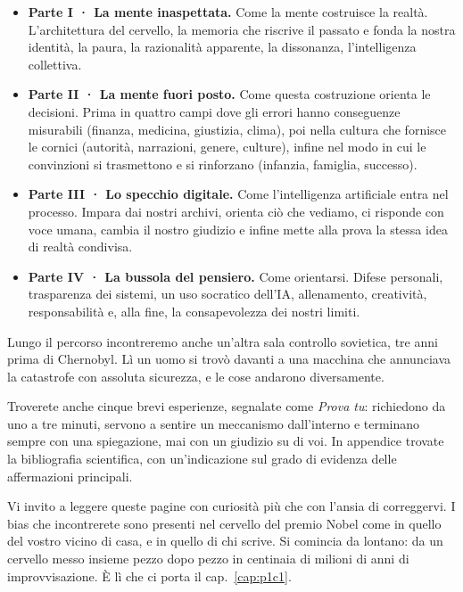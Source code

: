 \begin{itemize}
    \item \textbf{Parte I · La mente inaspettata.}
    Come la mente costruisce la realtà. L'architettura del cervello, la memoria che riscrive il passato e fonda la nostra identità, la paura, la razionalità apparente, la dissonanza, l'intelligenza collettiva.

    \item \textbf{Parte II · La mente fuori posto.}
    Come questa costruzione orienta le decisioni. Prima in quattro campi dove gli errori hanno conseguenze misurabili (finanza, medicina, giustizia, clima), poi nella cultura che fornisce le cornici (autorità, narrazioni, genere, culture), infine nel modo in cui le convinzioni si trasmettono e si rinforzano (infanzia, famiglia, successo).

    \item \textbf{Parte III · Lo specchio digitale.}
    Come l'intelligenza artificiale entra nel processo. Impara dai nostri archivi, orienta ciò che vediamo, ci risponde con voce umana, cambia il nostro giudizio e infine mette alla prova la stessa idea di realtà condivisa.

    \item \textbf{Parte IV · La bussola del pensiero.}
    Come orientarsi. Difese personali, trasparenza dei sistemi, un uso socratico dell'IA, allenamento, creatività, responsabilità e, alla fine, la consapevolezza dei nostri limiti.
\end{itemize}

Lungo il percorso incontreremo anche un'altra sala controllo sovietica, tre anni prima di Chernobyl. Lì un uomo si trovò davanti a una macchina che annunciava la catastrofe con assoluta sicurezza, e le cose andarono diversamente.

Troverete anche cinque brevi esperienze, segnalate come \textit{Prova tu}: richiedono da uno a tre minuti, servono a sentire un meccanismo dall'interno e terminano sempre con una spiegazione, mai con un giudizio su di voi. In appendice trovate la bibliografia scientifica, con un'indicazione sul grado di evidenza delle affermazioni principali.

Vi invito a leggere queste pagine con curiosità più che con l'ansia di correggervi. I bias che incontrerete sono presenti nel cervello del premio Nobel come in quello del vostro vicino di casa, e in quello di chi scrive. Si comincia da lontano: da un cervello messo insieme pezzo dopo pezzo in centinaia di milioni di anni di improvvisazione. È lì che ci porta il cap.~\ref{cap:p1c1}.
